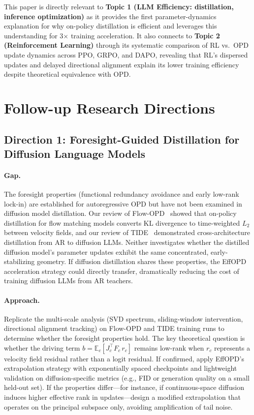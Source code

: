 \documentclass[11pt,a4paper]{article}
\begin{document}
This paper is directly relevant to \textbf{Topic 1 (LLM Efficiency: distillation, inference optimization)} as it provides the first parameter-dynamics explanation for why on-policy distillation is efficient and leverages this understanding for 3$\times$ training acceleration. It also connects to \textbf{Topic 2 (Reinforcement Learning)} through its systematic comparison of RL vs.\ OPD update dynamics across PPO, GRPO, and DAPO, revealing that RL's dispersed updates and delayed directional alignment explain its lower training efficiency despite theoretical equivalence with OPD.

\section{Follow-up Research Directions}

\subsection{Direction 1: Foresight-Guided Distillation for Diffusion Language Models}

\paragraph{Gap.} The foresight properties (functional redundancy avoidance and early low-rank lock-in) are established for autoregressive OPD but have not been examined in diffusion model distillation. Our review of Flow-OPD~\cite{flowopd} showed that on-policy distillation for flow matching models converts KL divergence to time-weighted $L_2$ between velocity fields, and our review of TIDE~\cite{tide} demonstrated cross-architecture distillation from AR to diffusion LLMs. Neither investigates whether the distilled diffusion model's parameter updates exhibit the same concentrated, early-stabilizing geometry. If diffusion distillation shares these properties, the EffOPD acceleration strategy could directly transfer, dramatically reducing the cost of training diffusion LLMs from AR teachers.

\paragraph{Approach.} Replicate the multi-scale analysis (SVD spectrum, sliding-window intervention, directional alignment tracking) on Flow-OPD and TIDE training runs to determine whether the foresight properties hold. The key theoretical question is whether the driving term $b = \mathbb{E}_c[J_c^\top F_c\, r_c]$ remains low-rank when $r_c$ represents a velocity field residual rather than a logit residual. If confirmed, apply EffOPD's extrapolation strategy with exponentially spaced checkpoints and lightweight validation on diffusion-specific metrics (e.g., FID or generation quality on a small held-out set). If the properties differ---for instance, if continuous-space diffusion induces higher effective rank in updates---design a modified extrapolation that operates on the principal subspace only, avoiding amplification of tail noise.
\end{document}
